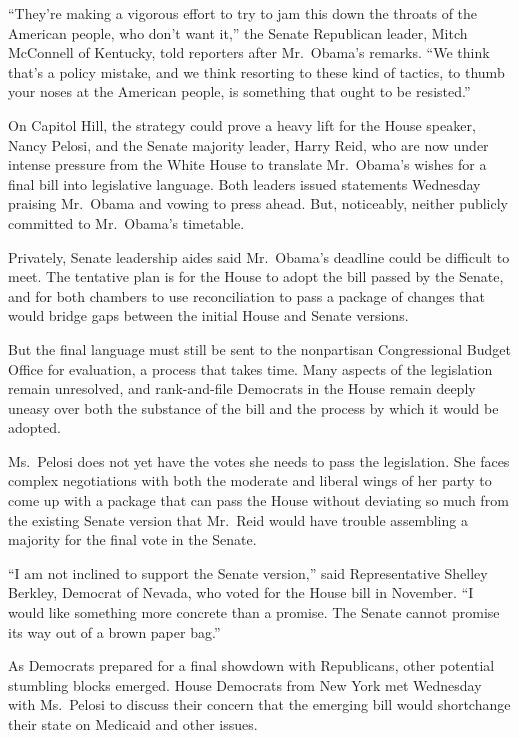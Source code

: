 ﻿\documentclass[12pt]{article}
\begin{document}
``They're making a vigorous effort to try to jam this down the throats of the American people, who
don't want it,'' the Senate Republican leader, Mitch McConnell of Kentucky, told reporters after
Mr.~Obama's remarks. ``We think that's a policy mistake, and we think resorting to these kind of
tactics, to thumb your noses at the American people, is something that ought to be resisted.''

On Capitol Hill, the strategy could prove a heavy lift for the House speaker, Nancy Pelosi, and the
Senate majority leader, Harry Reid, who are now under intense pressure from the White House to
translate Mr.~Obama's wishes for a final bill into legislative language. Both leaders issued
statements Wednesday praising Mr.~Obama and vowing to press ahead. But, noticeably, neither publicly
committed to Mr.~Obama's timetable.

Privately, Senate leadership aides said Mr.~Obama's deadline could be difficult to meet. The
tentative plan is for the House to adopt the bill passed by the Senate, and for both chambers to use
reconciliation to pass a package of changes that would bridge gaps between the initial House and
Senate versions.

But the final language must still be sent to the nonpartisan Congressional Budget Office for
evaluation, a process that takes time. Many aspects of the legislation remain unresolved, and
rank-and-file Democrats in the House remain deeply uneasy over both the substance of the bill and
the process by which it would be adopted.

Ms.~Pelosi does not yet have the votes she needs to pass the legislation. She faces complex
negotiations with both the moderate and liberal wings of her party to come up with a package that
can pass the House without deviating so much from the existing Senate version that Mr.~Reid would
have trouble assembling a majority for the final vote in the Senate.

``I am not inclined to support the Senate version,'' said Representative Shelley Berkley, Democrat
of Nevada, who voted for the House bill in November. ``I would like something more concrete than a
promise. The Senate cannot promise its way out of a brown paper bag.''

As Democrats prepared for a final showdown with Republicans, other potential stumbling blocks
emerged. House Democrats from New York met Wednesday with Ms.~Pelosi to discuss their concern that
the emerging bill would shortchange their state on Medicaid and other issues.
\end{document}
